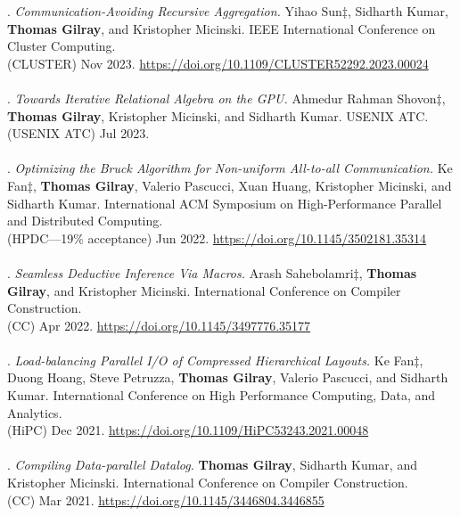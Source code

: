 \paper. \textit{Communication-Avoiding Recursive Aggregation.}
Yihao Sun$\ddagger$, Sidharth Kumar, \textbf{Thomas Gilray}, and Kristopher Micinski.
IEEE International Conference on Cluster Computing.
\\(CLUSTER) Nov 2023. \url{https://doi.org/10.1109/CLUSTER52292.2023.00024}
\\ \vspace{-0.1cm}\\
\paper. \textit{Towards Iterative Relational Algebra on the GPU.}
Ahmedur Rahman Shovon$\ddagger$, \textbf{Thomas Gilray}, Kristopher Micinski, and Sidharth Kumar.
USENIX ATC.
\\(USENIX ATC) Jul 2023.
\\ \vspace{-0.1cm}\\
\paper. \textit{Optimizing the Bruck Algorithm for Non-uniform All-to-all Communication.}
Ke Fan$\ddagger$, \textbf{Thomas Gilray}, Valerio Pascucci, Xuan Huang, Kristopher Micinski, and Sidharth Kumar.
International ACM Symposium on High-Performance Parallel and Distributed Computing.
\\(HPDC---19\% acceptance) Jun 2022. \url{https://doi.org/10.1145/3502181.35314}
\\ \vspace{-0.1cm}\\
\paper. \textit{Seamless Deductive Inference Via Macros.}
Arash Sahebolamri$\ddagger$, \textbf{Thomas Gilray}, and Kristopher Micinski.
International Conference on Compiler Construction.
\\(CC) Apr 2022. \url{https://doi.org/10.1145/3497776.35177}
\\ \vspace{-0.1cm}\\
\paper. \textit{Load-balancing Parallel I/O of Compressed Hierarchical Layouts.}
Ke Fan$\ddagger$, Duong Hoang, Steve Petruzza, \textbf{Thomas Gilray}, Valerio Pascucci, and Sidharth Kumar.
International Conference on High Performance Computing, Data, and Analytics.
\\(HiPC) Dec 2021. \url{https://doi.org/10.1109/HiPC53243.2021.00048}
\\ \vspace{-0.1cm}\\
\paper. \textit{Compiling Data-parallel Datalog.}
\textbf{Thomas Gilray}, Sidharth Kumar, and Kristopher Micinski.
International Conference on Compiler Construction.
\\(CC) Mar 2021. \url{https://doi.org/10.1145/3446804.3446855}
